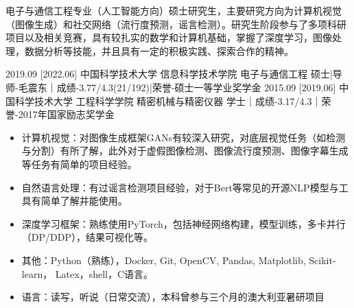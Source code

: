 \documentclass[zh]{resume}
\begin{document}
\makeheader

{\onehalfspacing\hspace{2em}%
电子与通信工程专业（人工智能方向）硕士研究生，主要研究方向为计算机视觉（图像生成）和社交网络（流行度预测，谣言检测）。研究生阶段参与了多项科研项目以及相关竞赛，具有较扎实的数学和计算机基础，掌握了深度学习，图像处理，数据分析等技能，并且具有一定的积极实践、探索合作的精神。
\par}

\begin{educations}

  \education%
    {2019.09}%
    [2022.06]%
    {中国科学技术大学}%
    {信息科学技术学院}%
    {电子与通信工程}%
    {硕士|导师-毛震东｜成绩-3.77/4.3(21/192)|荣誉-硕士一等学业奖学金}
  \separator{0.5ex}
  \education%
    {2015.09}%
    [2019.06]%
    {中国科学技术大学}%
    {工程科学学院}%
    {精密机械与精密仪器}%
    {学士｜成绩-3.17/4.3｜荣誉-2017年国家励志奖学金}
\end{educations}


\begin{itemize}
  \item 计算机视觉：对图像生成框架GANs有较深入研究，对底层视觉任务（如检测与分割）有所了解，此外对于虚假图像检测、图像流行度预测、图像字幕生成等任务有简单的项目经验。
  \item 自然语言处理：有过谣言检测项目经验，对于Bert等常见的开源NLP模型与工具有简单了解并能使用。
  \item 深度学习框架：熟练使用PyTorch，包括神经网络构建，模型训练，多卡并行（DP/DDP），结果可视化等。
  \item 其他：Python（熟练），Docker, Git, OpenCV, Pandas, Matplotlib, Scikit-learn， Latex，shell，C语言。
  \item 语言：读写，听说（日常交流），本科曾参与三个月的澳大利亚暑研项目
\end{itemize}
\end{document}
